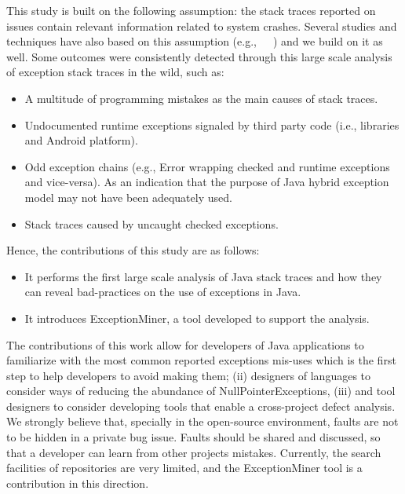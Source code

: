 \documentclass[conference]{IEEEtran}
\begin{document}
This study is built on the following assumption: the stack traces reported on
issues contain relevant information related to system crashes. Several studies
and techniques have also based on this assumption
(e.g.,~\cite{sinha2009fault}~\cite{dhaliwal2011classifying}~\cite{kim2013predicting})
and we build on it as well. Some outcomes were consistently detected through
this large scale analysis of exception stack traces in the wild, such as:

\begin{itemize}

  \item  A multitude of programming mistakes as the main causes of stack traces.
   
  \item Undocumented runtime exceptions signaled by third party
    code (i.e., libraries and Android platform).

  \item  Odd exception chains (e.g., Error wrapping checked and runtime
    exceptions and vice-versa). As an indication that the purpose of Java hybrid
    exception model may not have been adequately used.

  \item  Stack traces caused by uncaught checked exceptions.

\end{itemize}

Hence, the contributions of this study are as follows:
\begin{itemize}

  \item  It performs the first large scale analysis of Java stack traces and how
    they can reveal bad-practices on the use of exceptions in Java.

  \item  It introduces ExceptionMiner, a tool developed to support the
    analysis.

\end{itemize}


The contributions of this work allow for developers of Java applications
to familiarize with the most common reported exceptions mis-uses which is the
first step to help developers to avoid making them; (ii) designers of languages
to consider ways of reducing the abundance of NullPointerExceptions, (iii) and
tool designers to consider developing tools that enable a cross-project defect
analysis. We strongly believe that, specially in the open-source environment,
faults are not to be hidden in a private bug issue. Faults should be shared and
discussed, so that a developer can learn from other projects mistakes.
Currently, the search facilities of repositories are very limited, and the
ExceptionMiner tool is a contribution in this direction.
\end{document}
